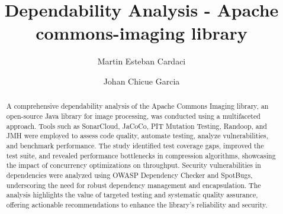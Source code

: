 \documentclass[sigconf]{acmart}
\begin{document}
\title{Dependability Analysis - Apache commons-imaging library}

\author{Martin Esteban Cardaci}

\author{Johan Chicue Garcia}




\renewcommand{\shortauthors}{Martin E Cardaci, and Johan Chicue Garcia}

\begin{abstract}
A comprehensive dependability analysis of the Apache Commons Imaging library, an open-source Java library for image processing, was conducted using a multifaceted approach. Tools such as SonarCloud, JaCoCo, PIT Mutation Testing, Randoop, and JMH were employed to assess code quality, automate testing, analyze vulnerabilities, and benchmark performance. The study identified test coverage gaps, improved the test suite, and revealed performance bottlenecks in compression algorithms, showcasing the impact of concurrency optimizations on throughput. Security vulnerabilities in dependencies were analyzed using OWASP Dependency Checker and SpotBugs, underscoring the need for robust dependency management and encapsulation. The analysis highlights the value of targeted testing and systematic quality assurance, offering actionable recommendations to enhance the library’s reliability and security.
\end{abstract}
\end{document}

